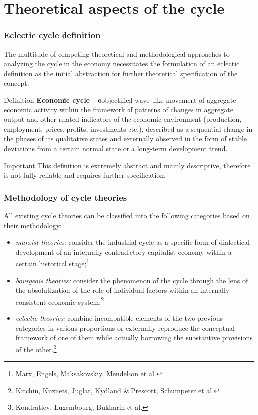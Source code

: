 \section{Theoretical aspects of the cycle}

\begin{frame}
  \frametitle{Eclectic cycle definition}
  The multitude of competing theoretical and methodological approaches to analyzing the cycle in the economy necessitates the formulation of an eclectic definition as the initial abstraction for further theoretical specification of the concept:

  \begin{block}{Definition}
    \textbf{Economic cycle} – оobjectified wave–like movement of aggregate economic activity within the framework of patterns of changes in aggregate output and other related indicators of the economic environment (production, employment, prices, profits, investments etc.), described as a sequential change in the phases of its qualitative states and externally observed in the form of stable deviations from a certain \textquotedbl{}normal\textquotedbl{} state or a long-term development trend.
  \end{block}

  \begin{alertblock}{Important}
    This definition is extremely abstract and mainly descriptive, therefore is not fully reliable and requires further specification.
  \end{alertblock}
\end{frame}

\begin{frame}
  \frametitle{Methodology of cycle theories}
  All existing cycle theories can be classified into the following categories based on their methodology:
  \begin{itemize}
    \item \textit{marxist theories:} consider the industrial cycle as a specific form of dialectical development of an internally contradictory capitalist economy within a certain historical stage;\footnote{Marx, Engels, Maksakovskiy, Mendelson et al.}
    \item \textit{bourgeois theories:} consider the phenomenon of the cycle through the lens of the absolutization of the role of individual factors within an internally consistent economic system;\footnote{Kitchin, Kuznets, Juglar, Kydland \& Prescott, Schumpeter et al.}
    \item \textit{eclectic theories:} combine incompatible elements of the two previous categories in various proportions or externally reproduce the conceptual framework of one of them while actually borrowing the substantive provisions of the other.\footnote{Kondratiev, Luxembourg, Bukharin et al.}
  \end{itemize}
\end{frame}

